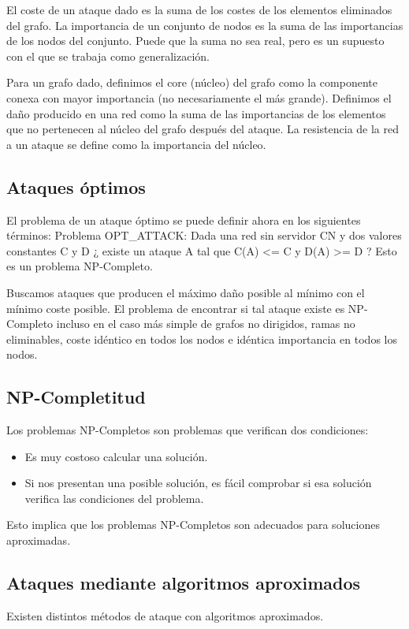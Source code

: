El coste de un ataque dado es la suma de los costes de los elementos eliminados del grafo. La importancia de un conjunto de nodos es la suma de las importancias de los nodos del conjunto. Puede que la suma no sea real, pero es un supuesto con el que se trabaja como generalización. 

Para un grafo dado, definimos el core (núcleo) del grafo como la componente conexa con mayor importancia (no necesariamente el más grande). Definimos el daño producido en una red como la suma de las importancias de los elementos que no pertenecen al núcleo del grafo después del ataque. La resistencia de la red a un ataque se define como la importancia del núcleo.

\subsection{Ataques óptimos}
El problema de un ataque óptimo se puede definir ahora en los siguientes términos:
Problema OPT\_ATTACK: Dada una red sin servidor CN y dos valores constantes C y D ¿ existe un ataque A tal que C(A) <= C y D(A) >= D ? Esto es un problema NP-Completo.

Buscamos ataques que producen el máximo daño posible al mínimo con el mínimo coste posible. El problema de encontrar si tal ataque existe es NP-Completo incluso en el caso más simple de grafos no dirigidos, ramas no eliminables, coste idéntico en todos los nodos e idéntica importancia en todos los nodos.

\subsection{NP-Completitud}
Los problemas NP-Completos son problemas que verifican dos condiciones:
\begin{itemize}
\item Es muy costoso calcular una solución.
\item Si nos presentan una posible solución, es fácil comprobar si esa solución verifica las condiciones del problema.
\end{itemize}
Esto implica que los problemas NP-Completos son adecuados para soluciones aproximadas.

\subsection{Ataques mediante algoritmos aproximados}
Existen distintos métodos de ataque con algoritmos aproximados.

